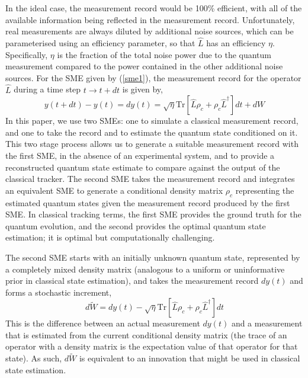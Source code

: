 \documentclass[conference]{IEEEtran}
\begin{document}
In the ideal case, the measurement record would be 100\% efficient, with all of the available information being reflected in the measurement record. Unfortunately, real measurements are always diluted by additional noise sources, which can be parameterised using an efficiency parameter, so that $\hat{L}$ has an efficiency $\eta$. Specifically, $\eta$ is the fraction of the total noise power due to the quantum measurement compared to the power contained in the other additional noise sources. For the SME given by (\ref{sme1}), the measurement record for the operator $\hat{L}$ during a time step $t\rightarrow t+dt$ is given by, 
$$
y(t+dt)-y(t)=dy(t)= \sqrt{\eta}\mathrm{Tr}[\hat{L}\rho_c+\rho_c \hat{L}^{\dagger}] dt+dW
$$
In this paper, we use two SMEs: one to simulate a classical measurement record, and one to take the record and to estimate the quantum state conditioned on it. This two stage process allows us to generate a suitable measurement record with the first SME, in the absence of an experimental system, and to provide a reconstructed quantum state estimate to compare against the output of the classical tracker. 
The second SME takes the measurement record and integrates an equivalent SME to generate a conditional density matrix $\rho_c$ representing the estimated quantum states given the measurement record produced by the first SME. In classical tracking terms, the first SME provides the ground truth for the quantum evolution, and the second provides the optimal quantum state estimation; it is optimal but computationally challenging.  

The second SME starts with an initially unknown quantum state, represented by a completely mixed density matrix (analogous to a uniform or uninformative prior in classical state estimation), and takes the measurement record $dy(t)$ and forms a stochastic increment,
$$
d\tilde{W}= dy(t) - \sqrt{\eta}\mathrm{Tr}[\hat{L}\rho_c+\rho_c \hat{L}^{\dagger}] dt
$$
This is the difference between an actual measurement $dy(t)$ and a measurement that is estimated from the current conditional density matrix (the trace of an operator with a density matrix is the expectation value of that operator for that state). As such, $d\tilde{W}$ is equivalent to an innovation that might be used in classical state estimation. 
\end{document}

